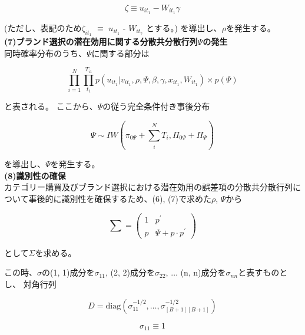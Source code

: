 \documentclass[11pt]{jsarticle}
\begin{document}
\begin{equation} \label{formula52-1}
\zeta \equiv u_{it_{1}} - W_{it_{1}} \gamma
\end{equation}

(ただし、表記のため$\zeta_{it_{1}}$ $\equiv$ $u_{it_{1}}$ - $W_{it_{\gamma}}$ とする。)
を導出し、$\rho$を発生する。\\[1ex] 

{\bf (7)ブランド選択の潜在効用に関する分散共分散行列$\Psi$の発生}\\
同時確率分布のうち、$\Psi$に関する部分は

\begin{equation} \label{formula53}
\prod_{i=1}^{N} \prod_{t_{1}}^{T_{i1}} p(u_{it_{1}} | v_{it_{1}}, \rho, \Psi, \beta, \gamma, x_{it_{1}}, W_{it_{1}}) \times p(\Psi)
\end{equation}

と表される。
ここから、$\Psi$の従う完全条件付き事後分布

\begin{equation} \label{formula54}
\Psi \sim IW
\left(
\pi_{0\Psi} + \sum_{\substack{i}}^{\substack{N}} T_{i}, \Pi_{0\Psi} + \Pi_{\Psi}
\right)
\end{equation}

を導出し、$\Psi$を発生する。\\[1ex] 

{\bf (8)識別性の確保}\\
カテゴリー購買及びブランド選択における潜在効用の誤差項の分散共分散行列について事後的に識別性を確保するため、(6), (7)で求めた$\rho$, $\Psi$から

\begin{equation} \label{formulad54-1}
\sum = 
\begin{pmatrix}
1 & p^\prime\\
p & \Psi + p \cdot p^\prime
\end{pmatrix}
\end{equation}

として$\Sigma$を求める。

この時、$\sigma$の(1, 1)成分を$\sigma_{11}$, (2, 2)成分を$\sigma_{22}$, $\ldots$ (n, n)成分を$\sigma_{nn}$と表すものとし、
対角行列

\begin{equation} \label{formula55}
D = \mbox{diag} (\sigma_{11}^{-1/2}, \ldots, \sigma_{[B+1][B+1]}^{-1/2})
\end{equation}

\begin{equation} \label{formula55-1}
\sigma_{11} \equiv 1
\end{equation}
\end{document}
